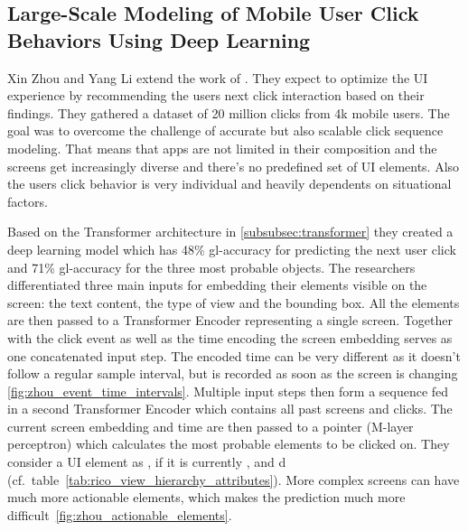 
\subsection{Large-Scale Modeling of Mobile User Click Behaviors Using Deep Learning}
\label{subsec:user-click-behaviors-deep-learning}

Xin Zhou and Yang Li \cite{zhou2021large} extend the work of \cite{lee2018click}.
They expect to optimize the UI experience by recommending the users next click interaction based on their findings.
They gathered a dataset of 20 million clicks from 4k mobile users.
The goal was to overcome the challenge of accurate but also scalable click sequence modeling.
That means that apps are not limited in their composition and the screens get increasingly diverse and there's no predefined set of UI elements.
Also the users click behavior is very individual and heavily dependents on situational factors.

Based on the Transformer architecture in \ref{subsubsec:transformer} they created a deep learning model which has 48\% \gls{gl-accuracy} for predicting the next user click and 71\% \gls{gl-accuracy} for the three most probable  objects.
The researchers differentiated three main inputs for embedding their elements visible on the screen: the text content, the type of view and the bounding box.
All the elements are then passed to a Transformer Encoder representing a single screen.
Together with the click event as well as the time encoding the screen embedding serves as one concatenated input step.
The encoded time can be very different as it doesn't follow a regular sample interval, but is recorded as soon as the screen is changing \ref{fig:zhou_event_time_intervals}.
Multiple input steps then form a sequence fed in a second Transformer Encoder which contains all past screens and clicks.
The current screen embedding and time are then passed to a pointer (M-layer perceptron) which calculates the most probable  elements to be clicked on.
They consider a UI element as , if it is currently ,  and d (cf.\ table~\ref{tab:rico_view_hierarchy_attributes}).
More complex screens can have much more actionable elements, which makes the prediction much more difficult~\ref{fig:zhou_actionable_elements}.


